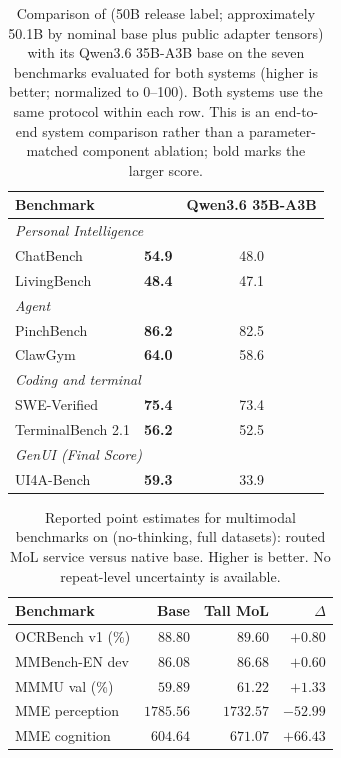 \begin{table}[!t]
  \centering
  \caption{Comparison of \tall{} (50B release label; approximately 50.1B by nominal base plus public adapter tensors) with its Qwen3.6 35B-A3B base on the seven benchmarks evaluated for both systems (higher is better; normalized to 0--100). Both systems use the same protocol within each row. This is an end-to-end system comparison rather than a parameter-matched component ablation; bold marks the larger score.}
  \label{tab:eval_tall}
  \small
  \setlength{\tabcolsep}{8pt}
  \begin{tabular}{lcc}
    \toprule
    Benchmark & \tall{} & Qwen3.6 35B-A3B \\
    \midrule
    \multicolumn{3}{l}{\emph{Personal Intelligence}} \\
    ChatBench         & \textbf{54.9} & 48.0 \\
    LivingBench       & \textbf{48.4} & 47.1 \\
    \midrule
    \multicolumn{3}{l}{\emph{Agent}} \\
    PinchBench        & \textbf{86.2} & 82.5 \\
    ClawGym           & \textbf{64.0} & 58.6 \\
    \midrule
    \multicolumn{3}{l}{\emph{Coding and terminal}} \\
    SWE-Verified      & \textbf{75.4} & 73.4 \\
    TerminalBench 2.1 & \textbf{56.2} & 52.5 \\
    \midrule
    \multicolumn{3}{l}{\emph{GenUI (Final Score)}} \\
    UI4A-Bench        & \textbf{59.3} & 33.9 \\
    \bottomrule
  \end{tabular}
\end{table}

\begin{table}[t]
\centering
\caption{Reported point estimates for multimodal benchmarks on \tall{} (no-thinking, full datasets): routed MoL service versus native base. Higher is better. No repeat-level uncertainty is available.}
\label{tab:mol_vl}
\begin{tabular}{lrrr}
\toprule
Benchmark & Base & Tall MoL & $\Delta$ \\
\midrule
OCRBench v1 (\%)       & $88.80$  & $89.60$  & $+0.80$ \\
MMBench-EN dev         & $86.08$  & $86.68$  & $+0.60$ \\
MMMU val (\%)           & $59.89$  & $61.22$  & $+1.33$ \\
MME perception          & $1785.56$ & $1732.57$ & $-52.99$ \\
MME cognition           & $604.64$  & $671.07$  & $+66.43$ \\
\bottomrule
\end{tabular}
\end{table}

